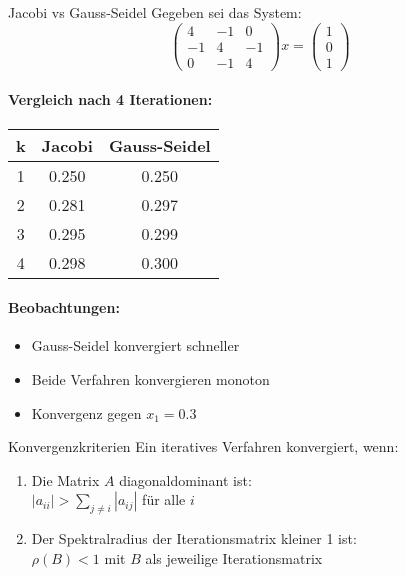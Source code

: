 \begin{example2}{Jacobi vs Gauss-Seidel}
Gegeben sei das System:
$$\begin{pmatrix}
4 & -1 & 0 \\
-1 & 4 & -1 \\
0 & -1 & 4
\end{pmatrix} x = \begin{pmatrix}
1 \\
0 \\
1
\end{pmatrix}$$

\paragraph{Vergleich nach 4 Iterationen:}
\begin{center}
\begin{tabular}{c|cc}
k & Jacobi & Gauss-Seidel \\\hline
1 & 0.250 & 0.250 \\
2 & 0.281 & 0.297 \\
3 & 0.295 & 0.299 \\
4 & 0.298 & 0.300
\end{tabular}
\end{center}

\paragraph{Beobachtungen:}
\begin{itemize}
    \item Gauss-Seidel konvergiert schneller
    \item Beide Verfahren konvergieren monoton
    \item Konvergenz gegen $x_1 = 0.3$
\end{itemize}
\end{example2}

\begin{theorem}{Konvergenzkriterien}
Ein iteratives Verfahren konvergiert, wenn:
\begin{enumerate}
    \item Die Matrix $A$ diagonaldominant ist:\\
    $|a_{ii}| > \sum_{j\neq i} |a_{ij}|$ für alle $i$
    \item Der Spektralradius der Iterationsmatrix kleiner 1 ist:\\
    $\rho(B) < 1$ mit $B$ als jeweilige Iterationsmatrix
\end{enumerate}
\end{theorem}

